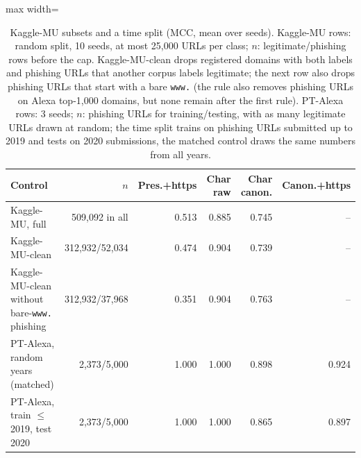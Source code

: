 \begin{table}[tp]
\centering
\caption{Kaggle-MU subsets and a time split (MCC, mean over seeds). Kaggle-MU rows: random split, 10 seeds, at most 25,000 URLs per class; $n$: legitimate/phishing rows before the cap. Kaggle-MU-clean drops registered domains with both labels and phishing URLs that another corpus labels legitimate; the next row also drops phishing URLs that start with a bare \texttt{www.} (the rule also removes phishing URLs on Alexa top-1,000 domains, but none remain after the first rule). PT-Alexa rows: 3 seeds; $n$: phishing URLs for training/testing, with as many legitimate URLs drawn at random; the time split trains on phishing URLs submitted up to 2019 and tests on 2020 submissions, the matched control draws the same numbers from all years.}
\label{tab:controls2}
\footnotesize
\setlength{\tabcolsep}{3pt}
\begin{adjustbox}{max width=\linewidth}
\begin{tabular}{@{}>{\raggedright\arraybackslash}p{4.2cm}rrrrr@{}}
\toprule
Control & $n$ & Pres.+https & Char raw & Char canon. & Canon.+https \\
\midrule
Kaggle-MU, full & 509,092 in all & 0.513 & 0.885 & 0.745 & -- \\
Kaggle-MU-clean & 312,932/52,034 & 0.474 & 0.904 & 0.739 & -- \\
Kaggle-MU-clean without bare-\texttt{www.} phishing & 312,932/37,968 & 0.351 & 0.904 & 0.763 & -- \\
\midrule
PT-Alexa, random years (matched) & 2,373/5,000 & 1.000 & 1.000 & 0.898 & 0.924 \\
PT-Alexa, train $\le$2019, test 2020 & 2,373/5,000 & 1.000 & 1.000 & 0.865 & 0.897 \\
\bottomrule
\end{tabular}
\end{adjustbox}
\end{table}
